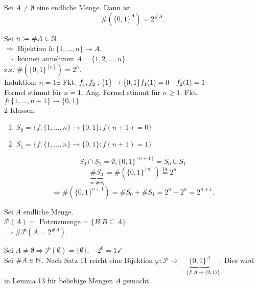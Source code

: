 \documentclass[../ana1.tex]{subfiles}
\begin{document}
\begin{satz}
	Sei \(A\neq\emptyset \) eine endliche Menge. Dann ist 
	\[ \#( {\{0,1\}}^A) = 2^{\#A}. \]
\end{satz}
\begin{bew}
	Sei \(n \coloneqq \# A \in\mathbb{N} \). \\
	\(\Rightarrow \) Bijektion \(h:\{1,\ldots,n\} \rightarrow A \). \\
	\( \Rightarrow \) können annehmen \(A = \{1,2,\ldots,n\} \) \\
	z.z. \( \#( {\{0,1\}}^{[n]} ) = 2^n \). \\
	Induktion: \(n=1 \exists \) Fkt. \(f_1,f_2 : \{1\} \rightarrow \{0,1\} \\
	f_1(1) = 0 \quad f_2(1) = 1 \) \\
	Formel stimmt für \(n=1 \).
	Ang. Formel stimmt für \(n\geq 1 \). Fkt. \(f: \{1,\ldots, n+1\} \rightarrow \{0,1\} \) \\
	2 Klassen:
	\begin{enumerate}
		\item \(S_0 = \{f: \{1,\ldots,n\} \rightarrow \{0,1\}: f(n+1) = 0 \} \)
		\item \(S_1 = \{f: \{1,\ldots,n\} \rightarrow \{0,1\}: f(n+1) = 1 \} \)
	\end{enumerate}
	\[S_0 \cap S_1 = \emptyset, {\{0,1\}}^{[n+1]} = S_0 \cup S_1 \]
	\[\underbrace{\# S_0}_{=\#S_1} = \# ( {\{0,1\}}^{[n]} )  \overset{\text{IA}}{=} 2^n \]
	\[ \Rightarrow \# ( {\{0,1\}}^{n+1} ) = \#S_0+\#S_1 = 2^n + 2^n = 2^{n+1}. \]
\end{bew}

\begin{kor}
	Sei \(A \) endliche Menge. \\
	\(\mathcal{P}(A) = \) Potenzmenge = \( \{B | B \subseteq A\} \) \\
	\(\Rightarrow \#\mathcal{P}(A = 2^{\#A}) \).
\end{kor}
\begin{bew}
	Sei \(A\neq \emptyset \Rightarrow\mathcal{P}(\emptyset) = \{\emptyset \}, \quad 2^0 = 1 \checkmark{} \) \\
	Sei \( \#A \in\mathbb{N} \). Nach Satz 11 reicht eine Bijektion \( \varphi : \mathcal{P} \rightarrow \underbrace{{\{0,1\}}^A}_{= \{f: A \rightarrow \{0,1 \} \}} \). Dies wird in Lemma 13 für beliebige Mengen \(A \) gemacht.
\end{bew}
\end{document}
